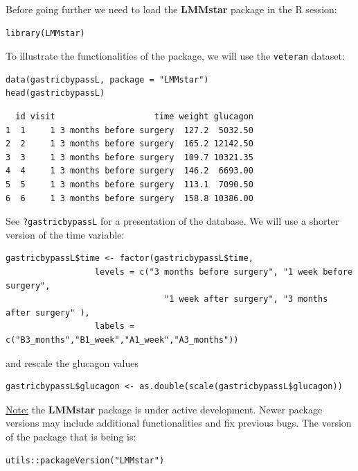 \documentclass[12pt]{article}
\begin{document}
\clearpage

Before going further we need to load the \textbf{LMMstar} package in the R
session:
\lstset{language=r,label= ,caption= ,captionpos=b,numbers=none}
\begin{lstlisting}
library(LMMstar)
\end{lstlisting}

To illustrate the functionalities of the package, we will use the
\texttt{veteran} dataset:
\lstset{language=r,label= ,caption= ,captionpos=b,numbers=none}
\begin{lstlisting}
data(gastricbypassL, package = "LMMstar")
head(gastricbypassL)
\end{lstlisting}

\begin{verbatim}
  id visit                    time weight glucagon
1  1     1 3 months before surgery  127.2  5032.50
2  2     1 3 months before surgery  165.2 12142.50
3  3     1 3 months before surgery  109.7 10321.35
4  4     1 3 months before surgery  146.2  6693.00
5  5     1 3 months before surgery  113.1  7090.50
6  6     1 3 months before surgery  158.8 10386.00
\end{verbatim}


See \texttt{?gastricbypassL} for a presentation of the database. We will use a shorter version of the time variable:
\lstset{language=r,label= ,caption= ,captionpos=b,numbers=none}
\begin{lstlisting}
gastricbypassL$time <- factor(gastricbypassL$time,
			      levels = c("3 months before surgery", "1 week before surgery",
							    "1 week after surgery", "3 months after surgery" ),
			      labels = c("B3_months","B1_week","A1_week","A3_months"))
\end{lstlisting}
and rescale the glucagon values
\lstset{language=r,label= ,caption= ,captionpos=b,numbers=none}
\begin{lstlisting}
gastricbypassL$glucagon <- as.double(scale(gastricbypassL$glucagon))
\end{lstlisting}

\bigskip

\uline{Note:} the \textbf{LMMstar} package is under active development. Newer
package versions may include additional functionalities and fix
previous bugs. The version of the package that is being is:
\lstset{language=r,label= ,caption= ,captionpos=b,numbers=none}
\begin{lstlisting}
utils::packageVersion("LMMstar")
\end{lstlisting}
\end{document}
